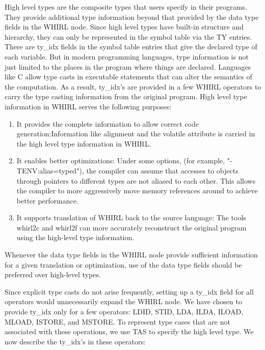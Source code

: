 High level types are the composite types that users specify in
their programs. They provide additional type information beyond
that provided by the data type fields in the WHIRL node. Since high
level types have built-in structure and hierarchy, they can only
be represented in the symbol table via the TY entries. There are
ty\_idx fields in the symbol table entries that give the declared
type of each variable. But in modern programming languages, type
information is not just limited to the places in the program where
things are declared. Languages like C allow type casts in executable
statements that can alter the semantics of the computation. As
a result, ty\_idx's are provided in a few WHIRL operators to carry
the type
casting information from the original program. High level type
information in WHIRL serves the following purposes: 

\begin{enumerate}
\item It provides
the complete information to allow correct code generation:Information
like alignment and the volatile attribute is carried in the high
level type information in WHIRL. 
\item It enables better optimizations:
Under some options, (for example, "-TENV:alias=typed"), the compiler
can assume that accesses to objects through pointers to different
types are not aliased to each other. This allows the compiler to
more aggressively move memory references around to achieve better
performance. 
\item It supports translation of WHIRL back to the source
language: The tools whirl2c and whirl2f can more accurately reconstruct
the original program using the high-level type information. 
\end{enumerate}

Whenever the data type fields in the WHIRL node provide sufficient information
for a given translation or optimization, use of the data type fields
should be preferred over high-level types. 

Since explicit type casts do not arise frequently, setting up a
ty\_idx field for all operators would unnecessarily expand the WHIRL
node. We have chosen to provide ty\_idx only for a few operators:
%
LDID,
%
STID,
%
LDA,
%
ILDA,
%
ILOAD,
%
MLOAD,
%
ISTORE, and
%
MSTORE. To represent
type cases that are not associated with these operations, we use
TAS to specify the high level type. We now describe the ty\_idx's in
these operators:

